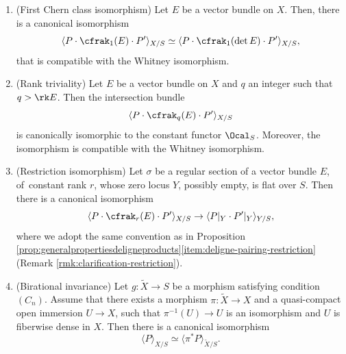 \begin{proposition}
\begin{enumerate}
\item\label{item:first-chern-determinant} (First Chern class isomorphism) Let $E$ be a vector bundle on $X$. Then, there is a canonical isomorphism
\begin{displaymath}
\langle P\cdot \cfrak_{1}(E)\cdot P'\rangle_{X/S} \simeq \langle P\cdot \cfrak_{1}(\det E)\cdot P'\rangle_{X/S},
\end{displaymath}
that is compatible with the Whitney isomorphism.
\item \label{item:Chern-rank}(Rank triviality) Let $E$ be a vector bundle on $X$ and $q$ an integer such that $q > \rk E$. Then the intersection bundle
\begin{displaymath}
\langle P \cdot \cfrak_q(E) \cdot P' \rangle_{X/S}
\end{displaymath}
is canonically isomorphic to the constant functor $\Ocal_S$. Moreover, the isomorphism is compatible with the Whitney isomorphism.
\item\label{item:restriction-isomorphism} (Restriction isomorphism) Let $\sigma$ be a regular section of a vector bundle $E$, of~constant rank $r$, whose zero locus $Y$, possibly empty, is flat over $S$. Then there is a canonical isomorphism
\begin{displaymath}
\langle P \cdot \cfrak_{r}(E) \cdot P' \rangle_{X/S} \to \langle P|_Y \cdot P'|_Y \rangle_{Y/S},
\end{displaymath}
where we adopt the same convention as in Proposition \ref{prop:generalpropertiesdeligneproducts}\eqref{item:deligne-pairing-restriction} (\cf Remark \ref{rmk:clarification-restriction}).
\item \label{item:birational-invariance} (Birational invariance) Let $g: \widetilde{X} \to S$ be a morphism satisfying condition $(C_n)$. Assume that there exists a morphism $\pi\colon \widetilde{X} \to X$ and a quasi-compact open immersion $U \to X$, such that $\pi^{-1}(U) \to U$ is an isomorphism and $U$ is fiberwise dense in $X$.
Then there is a canonical isomorphism
\begin{displaymath}
\langle P \rangle_{X/S}\simeq \langle \pi^\ast P \rangle_{\widetilde{X}/S}.
\end{displaymath}
\end{enumerate}
\end{proposition}

